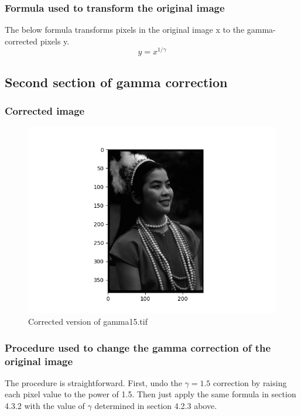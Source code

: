 \documentclass{article}
\begin{document}
\subsubsection{Formula used to transform the original image}
The below formula transforms pixels in the original image x to the gamma-corrected pixels y.
\begin{equation*}
    y = x^{1/\gamma}
\end{equation*}

\subsection{Second section of gamma correction}
\subsubsection{Corrected image}
\begin{figure}[H]
    \centering
    \includegraphics[width=1\textwidth]{../gamma15-gamma-corrected.png}
    \caption{Corrected version of gamma15.tif}
\end{figure}
\subsubsection{Procedure used to change the gamma correction of the original image}
The procedure is straightforward. First, undo the $\gamma = 1.5$ correction by raising each pixel value to the power of 1.5. Then just apply the same formula in section 4.3.2 with the value of $\gamma$ determined in section 4.2.3 above.
\end{document}
